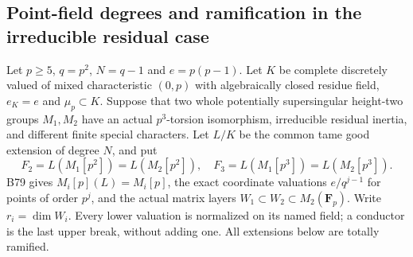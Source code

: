 \subsection{Point-field degrees and ramification in the irreducible residual case}

Let $p\ge5$, $q=p^2$, $N=q-1$ and $e=p(p-1)$. Let $K$ be
complete discretely valued of mixed characteristic $(0,p)$ with
algebraically closed residue field, $e_K=e$ and $\mu_p\subset K$.
Suppose that two whole potentially supersingular height-two groups
$M_1,M_2$ have an actual $p^3$-torsion isomorphism, irreducible
residual inertia, and different finite special characters. Let
$L/K$ be the common tame good extension of degree $N$, and put
\[
 F_2=L(M_1[p^2])=L(M_2[p^2]),\quad
 F_3=L(M_1[p^3])=L(M_2[p^3]).                         \tag{B-RD97.1}
\]
B79 gives $M_i[p](L)=M_i[p]$, the exact coordinate valuations
$e/q^{j-1}$ for points of order $p^j$, and the actual matrix
layers $W_1\subset W_2\subset M_2(\mathbf F_p)$. Write
$r_i=\dim W_i$. Every lower valuation is normalized on its
named field; a conductor is the last upper break, without adding
one. All extensions below are totally ramified.


